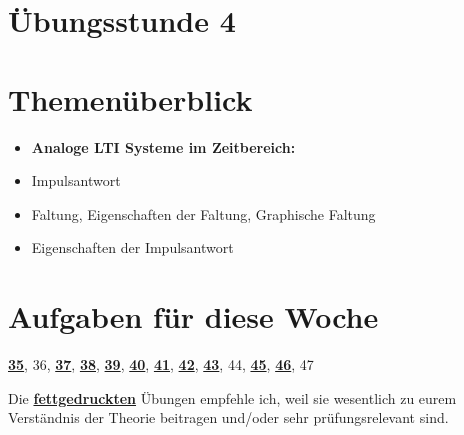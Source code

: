 \documentclass[11pt]{article}
\begin{document}
\thispagestyle{firstpage}

\setlength{\headheight}{1 \baselineskip}  %
\setlength{\parindent}{0pt}  %
\setlength{\parskip}{\baselineskip}  %

\vspace*{-5px}
\section*{Übungsstunde 4}

\section*{Themenüberblick}
\begin{itemize}
    \item \textbf{Analoge LTI Systeme im Zeitbereich:}
    \item[] Impulsantwort
    \item[] Faltung, Eigenschaften der Faltung, Graphische Faltung
    \item[] Eigenschaften der Impulsantwort
\end{itemize}

\section*{Aufgaben für diese Woche}
\vspace{-0.5cm}

\underline{\textbf{35}}, 36, \underline{\textbf{37}}, \underline{\textbf{38}}, \underline{\textbf{39}}, \underline{\textbf{40}}, \underline{\textbf{41}}, \underline{\textbf{42}}, \underline{\textbf{43}}, 44, \underline{\textbf{45}}, \underline{\textbf{46}}, 47\\
\vspace{-0.5cm}

Die \underline{\textbf{fettgedruckten}} Übungen empfehle ich, weil sie wesentlich zu eurem Verständnis der Theorie beitragen und/oder sehr prüfungsrelevant sind.

\vfill \null
\pagebreak
\end{document}
